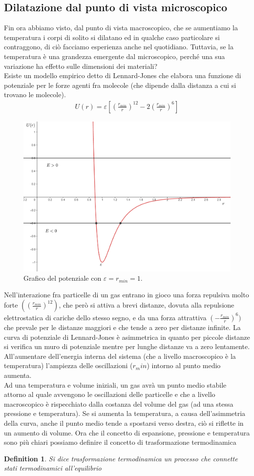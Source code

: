 \documentclass[10pt,a4paper]{article}
\newtheorem{definition}{Definition}
\begin{document}
\subsection{Dilatazione dal punto di vista microscopico}
Fin ora abbiamo visto, dal punto di vista macroscopico, che se aumentiamo la temperatura i corpi di solito si dilatano ed in qualche caso particolare si contraggono, di ciò facciamo esperienza anche nel quotidiano. Tuttavia, se la temperatura è una grandezza emergente dal microscopico, perché una sua variazione ha effetto sulle dimensioni dei materiali?\\
Esiste un modello empirico detto di Lennard-Jones che elabora una funzione di potenziale per le forze agenti fra molecole (che dipende dalla distanza a cui si trovano le molecole). 
\begin{align*} 
	U(r) = \varepsilon[(\frac{r_{min}}{r})^{12}-2(\frac{r_{min}}{r})^6]
\end{align*} 
\begin{figure}[h!]
	\centering
	\includegraphics[width=0.6\linewidth]{../images/../images/Lennard-Jones_model}
	\caption{Grafico del potenziale con $\varepsilon =r_{min} = 1$.}
	\label{fig:lennard-jonesmodel}
\end{figure}
\FloatBarrier
Nell'interazione fra particelle di un gas entrano in gioco una forza repulsiva molto forte $((\frac{r_{min}}{r})^{12})$, che però si attiva a brevi distanze, dovuta alla repulsione elettrostatica di cariche dello stesso segno, e da una forza attrattiva $(-\frac{r_{min}}{r})^6)$ che prevale per le distanze maggiori e che tende a zero per distanze infinite. La curva di potenziale di Lennard-Jones è asimmetrica in quanto per piccole distanze si verifica un muro di potenziale mentre per lunghe distanze va a zero lentamente. All'aumentare dell'energia interna del sistema (che a livello macroscopico è la temperatura) l'ampiezza delle oscillazioni ($r_min$) intorno al punto medio aumenta.\\
Ad una temperatura e volume iniziali, un gas avrà un punto medio stabile attorno al quale avvengono le oscillazioni delle particelle e che a livello macroscopico è rispecchiato dalla costanza del volume del gas (ad una stessa pressione e temperatura). Se si aumenta la temperatura, a causa dell'asimmetria della curva, anche il punto medio tende a spostarsi verso destra, ciò si riflette in un aumento di volume. Ora che il concetto di espansione, pressione e temperatura sono più chiari possiamo definire il concetto di trasformazione termodinamica
\begin{definition}
	Si dice trasformazione termodinamica un processo che connette stati termodinamici all'equilibrio
\end{definition}
\end{document}
